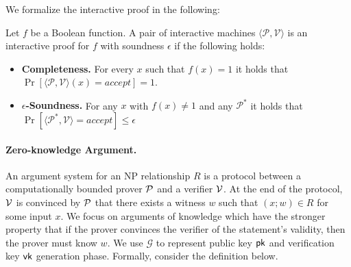 We formalize the interactive proof in the following:	
\begin{definition}\label{def:ip}
	Let $f$ be a Boolean function. A pair of interactive machines $\langle\mathcal{P}, \mathcal{V}\rangle$ is an interactive proof for $f$ with soundness $\epsilon$ if the following holds:
	\begin{itemize}
		\item {\bf Completeness.} For every $x$ such that $f(x) = 1$ it holds that $\Pr[\langle\mathcal{P}, \mathcal{V}\rangle(x)=accept]=1$.
		\item {\bf $\epsilon$-Soundness.} For any $x$ with $f(x) \neq 1$ and any $\mathcal{P}^*$ it holds that $\Pr[\langle\mathcal{P^*},\mathcal{V}\rangle=accept] \le \epsilon$
	\end{itemize}
\end{definition}


\paragraph{Zero-knowledge Argument.} An argument system for an NP relationship $R$ is a protocol between a computationally bounded prover $\P$ and a verifier $\V$. At the end of the protocol, $\V$ is convinced by $\P$ that there exists a witness $w$ such that $(x; w) \in R$ for some input $x$. We focus on arguments of knowledge which have the stronger property that if the prover convinces the verifier of the statement’s validity, then the prover must know $w$. We use $\mathcal{G}$ to represent public key $\pk$ and verification key $\vk$ generation phase. Formally, consider the definition below.

